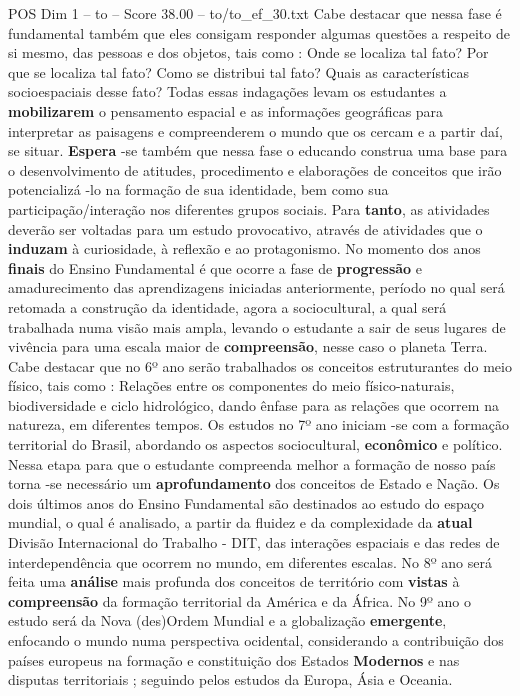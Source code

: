 \begin{textsample}{POS Dim 1 – to – Score 38.00 – to/to\_ef\_30.txt}
Cabe destacar que nessa fase é fundamental também que eles consigam responder algumas questões a respeito de si mesmo, das pessoas e dos objetos, tais como : Onde se localiza tal fato?
Por que se localiza tal fato?
Como se distribui tal fato?
Quais as características socioespaciais desse fato?
Todas essas indagações levam os estudantes a \textbf{mobilizarem} o pensamento espacial e as informações geográficas para interpretar as paisagens e compreenderem o mundo que os cercam e a partir daí, se situar. \textbf{Espera} -se também que nessa fase o educando construa uma base para o desenvolvimento de atitudes, procedimento e elaborações de conceitos que irão potencializá -lo na formação de sua identidade, bem como sua participação/interação nos diferentes grupos sociais.
Para \textbf{tanto}, as atividades deverão ser voltadas para um estudo provocativo, através de atividades que o \textbf{induzam} à curiosidade, à reflexão e ao protagonismo.
No momento dos anos \textbf{finais} do Ensino Fundamental é que ocorre a fase de \textbf{progressão} e amadurecimento das aprendizagens iniciadas anteriormente, período no qual será retomada a construção da identidade, agora a sociocultural, a qual será trabalhada numa visão mais ampla, levando o estudante a sair de seus lugares de vivência para uma escala maior de \textbf{compreensão}, nesse caso o planeta Terra.
Cabe destacar que no 6º ano serão trabalhados os conceitos estruturantes do meio físico, tais como : Relações entre os componentes do meio físico-naturais, biodiversidade e ciclo hidrológico, dando ênfase para as relações que ocorrem na natureza, em diferentes tempos.
Os estudos no 7º ano iniciam -se com a formação territorial do Brasil, abordando os aspectos sociocultural, \textbf{econômico} e político.
Nessa etapa para que o estudante compreenda melhor a formação de nosso país torna -se necessário um \textbf{aprofundamento} dos conceitos de Estado e Nação.
Os dois últimos anos do Ensino Fundamental são destinados ao estudo do espaço mundial, o qual é analisado, a partir da fluidez e da complexidade da \textbf{atual} Divisão Internacional do Trabalho - DIT, das interações espaciais e das redes de interdependência que ocorrem no mundo, em diferentes escalas.
No 8º ano será feita uma \textbf{análise} mais profunda dos conceitos de território com \textbf{vistas} à \textbf{compreensão} da formação territorial da América e da África.
No 9º ano o estudo será da Nova (des)Ordem Mundial e a globalização \textbf{emergente}, enfocando o mundo numa perspectiva ocidental, considerando a contribuição dos países europeus na formação e constituição dos Estados \textbf{Modernos} e nas disputas territoriais ; seguindo pelos estudos da Europa, Ásia e Oceania.

\end{textsample}
